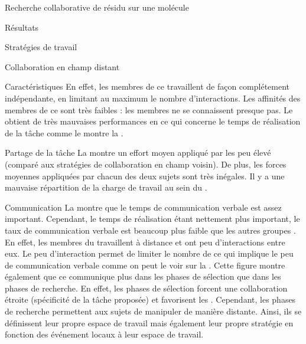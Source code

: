\documentclass[myfrancais,ngerman,english,frenchb]{mythesis}
\begin{document}
\begin{mychapter}{Recherche collaborative de résidu sur une molécule}
\begin{mysection}{Résultats}
\begin{mysubsection}{Stratégies de travail}
\begin{mysubsubsection}{Collaboration en champ distant}
\begin{myparagraph}{Caractéristiques}
						En effet, les membres de ce  travaillent de façon complétement indépendante, en limitant au maximum le nombre d'interactions.
						Les affinités des membres de ce  sont très faibles  : les membres ne se connaissent presque pas.
						Le  obtient de très mauvaises performances en ce qui concerne le temps de réalisation de la tâche comme le montre la .
					\end{myparagraph}
					\begin{myparagraph}{Partage de la tâche}
						La  montre un effort moyen appliqué par les  peu élevé (comparé aux stratégies de collaboration en champ voisin).
						De plus, les forces moyennes appliquées par chacun des deux sujets sont très inégales.
						Il y a une mauvaise répartition de la charge de travail au sein du .
					\end{myparagraph}
					\begin{myparagraph}{Communication}
						La  montre que le temps de communication verbale est assez important.
						Cependant, le temps de réalisation étant nettement plus important, le taux de communication verbale est beaucoup plus faible que les autres groupes .
						En effet, les membres du  travaillent à distance et ont peu d'interactions entre eux.
						Le peu d'interaction permet de limiter le nombre de  ce qui implique le peu de communication verbale comme on peut le voir sur la .
						Cette figure montre également que ce  communique plus dans les phases de sélection que dans les phases de recherche.
						En effet, les phases de sélection forcent une collaboration étroite (spécificité de la tâche proposée) et favorisent les .
						Cependant, les phases de recherche permettent aux sujets de manipuler de manière distante.
						Ainsi, ils se définissent leur propre espace de travail mais également leur propre stratégie en fonction des événement locaux à leur espace de travail.

\end{myparagraph}
\end{mysubsubsection}
\end{mysubsection}
\end{mysection}
\end{mychapter}
\end{document}
